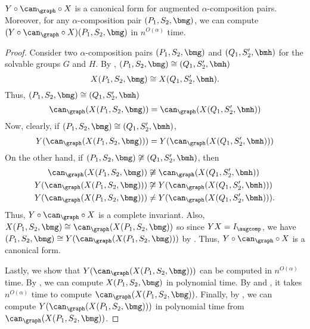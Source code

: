\begin{theorem}
  \label{thm:aug-alpha-can}
  $Y \circ \can_{\graph} \circ X$ is a canonical form for augmented $\alpha$-composition pairs.  Moreover, for any $\alpha$-composition pair $(P_1, S_2, \bmg)$, we can compute $(Y \circ \can_{\graph} \circ X)(P_1, S_2, \bmg)$ in $n^{O(\alpha)}$ time.
\end{theorem}

\begin{proof}
  Consider two $\alpha$-composition pairs $(P_1, S_2, \bmg)$ and $(Q_1, S_2', \bmh)$ for the solvable groups $G$ and $H$.  By , $(P_1, S_2, \bmg) \cong (Q_1, S_2', \bmh)$ \ifft 
  \begin{equation*}
    X(P_1, S_2, \bmg) \cong X(Q_1, S_2', \bmh).
  \end{equation*}
Thus, $(P_1, S_2, \bmg) \cong (Q_1, S_2', \bmh)$ \ifft
\begin{equation*}
  \can_{\graph}(X(P_1, S_2, \bmg)) = \can_{\graph}(X(Q_1, S_2', \bmh))
\end{equation*}
Now, clearly, if $(P_1, S_2, \bmg) \cong (Q_1, S_2', \bmh)$,
\begin{equation*}
  Y(\can_{\graph}(X(P_1, S_2, \bmg))) = Y(\can_{\graph}(X(Q_1, S_2', \bmh)))
\end{equation*}
On the other hand, if $(P_1, S_2, \bmg) \not\cong (Q_1, S_2', \bmh)$, then
\begin{align*}
  \can_{\graph}(X(P_1, S_2, \bmg))    & \not\cong \can_{\graph}(X(Q_1, S_2', \bmh)) \\
  Y(\can_{\graph}(X(P_1, S_2, \bmg))) & \not\cong Y(\can_{\graph}(X(Q_1, S_2', \bmh))) \\
  Y(\can_{\graph}(X(P_1, S_2, \bmg))) & \not= Y(\can_{\graph}(X(Q_1, S_2', \bmh))).
\end{align*}
 Thus, $Y \circ \can_{\graph} \circ X$ is a complete invariant.  Also, $X(P_1, S_2, \bmg) \cong \can_{\graph}(X(P_1, S_2, \bmg))$ so since $Y X = I_{\augcomp}$, we have $(P_1, S_2, \bmg) \cong Y(\can_{\graph}(X(P_1, S_2, \bmg)))$ by .  Thus, $Y \circ \can_{\graph} \circ X$ is a canonical form.

  Lastly, we show that $Y(\can_{\graph}(X(P_1, S_2, \bmg)))$ can be computed in $n^{O(\alpha)}$ time.  By , we can compute $X(P_1, S_2, \bmg)$ in polynomial time.  By  and , it takes $n^{O(\alpha)}$ time to compute $\can_{\graph}(X(P_1, S_2, \bmg))$.  Finally, by , we can compute $Y(\can_{\graph}(X(P_1, S_2, \bmg)))$ in polynomial time from $\can_{\graph}(X(P_1, S_2, \bmg))$.
\end{proof}

